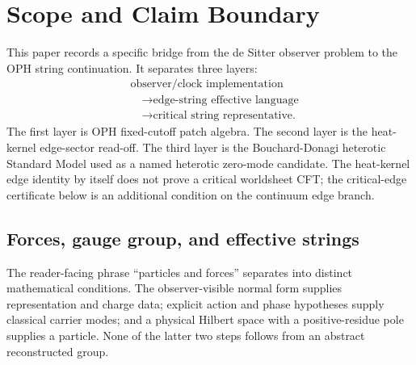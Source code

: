 \documentclass[11pt]{article}
\theoremstyle{remark}
\theoremstyle{plain}
\begin{document}
\tableofcontents
\newpage

\section{Scope and Claim Boundary}

This paper records a specific bridge from the de Sitter observer problem to the OPH string
continuation. It separates three layers:
\[
\begin{aligned}
&\text{observer/clock implementation}\\
&\quad\longrightarrow \text{edge-string effective language}\\
&\quad\longrightarrow \text{critical string representative.}
\end{aligned}
\]
The first layer is OPH fixed-cutoff patch algebra. The second layer is the heat-kernel
edge-sector read-off. The third layer is the Bouchard-Donagi heterotic Standard Model used as a
named heterotic zero-mode candidate. The heat-kernel edge identity by itself does not prove a critical
worldsheet CFT; the critical-edge certificate below is an additional condition on the continuum
edge branch.

\subsection{Forces, gauge group, and effective strings}

The reader-facing phrase ``particles and forces'' separates into distinct mathematical conditions.
The observer-visible normal form supplies representation
and charge data; explicit action and phase hypotheses supply classical carrier modes; and a
physical Hilbert space with a positive-residue pole supplies a particle. None of the latter two
steps follows from an abstract reconstructed group.
\end{document}

